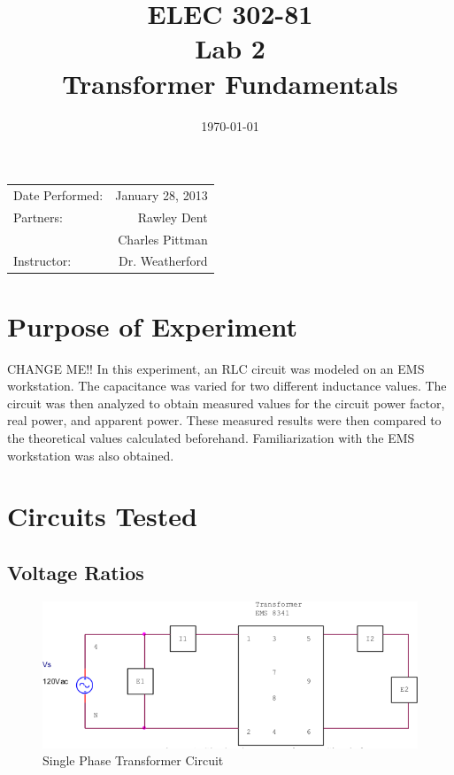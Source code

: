 \documentclass{article}
\title{ELEC 302-81\\ Lab 2\\ Transformer Fundamentals} %
\date{\today} %
\begin{document}
\maketitle

\begin{center}
  \begin{tabular}{lr}
    Date Performed: & January 28, 2013 \\
    Partners: & Rawley Dent \\
              & Charles Pittman \\
    Instructor: & Dr. Weatherford
  \end{tabular}
\end{center}

\pagebreak


\section{Purpose of Experiment}
CHANGE ME!! In this experiment, an RLC circuit was modeled on an EMS
workstation.  The capacitance was varied for two different inductance values.
The circuit was then analyzed to obtain measured values for the circuit power
factor, real power, and apparent power. These measured results were then
compared to the theoretical values calculated beforehand. Familiarization with
the EMS workstation was also obtained.

\section{Circuits Tested}
\subsection{Voltage Ratios}
\begin{figure}[H]
  \centering
  \includegraphics[width=.8\textwidth]{img/circuit_01}
  \caption{Single Phase Transformer Circuit}
  \label{fig:circuit_01}
\end{figure}
\end{document}
